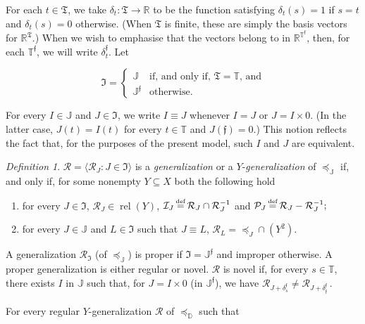 \documentclass[ecta,nameyear,draft]{econsocart}
\newcommand{\bs}{-}%
\newcommand{\R}{\mathbb R}
\newcommand{\mc}{\mathcal}
\newcommand\defeq{\mathrel{\overset{\makebox[0pt]{\mbox{\normalfont\tiny def}}}{=}}}%
\newcommand{\relations}{\operatorname{rel}}
\newcommand{\novel}{\mathfrak f}
\newcommand{\preceqb}{\mathbin{\preceq}}
\newcommand{\ext}{\mathrel{\mc R}}
\newcommand{\extb}{\mathbin{\mc R}}
\newcommand{\sextb}{\mathbin{\mc P}}
\newcommand{\nextb}{\mathbin{\mc I}}
\newcommand{\mbbd}{{\mathds D}}
\newcommand{\mbbt}{{\mathds {T}}}
\newcommand{\mbbtp}{{\mathds{T}^\novel}}
\newcommand{\mbbtpp}{{\mathfrak{T}}}
\newcommand{\mbbj}{\mathds J}
\newcommand{\mbbjp}{{\mathds {J}^{\novel}}}
\newcommand{\mbbjpp}{\mathfrak{I}}
\theoremstyle{plain}
\theoremstyle{remark}
\newtheorem{definition}{Definition}%
\begin{document}
\begin{appendix}
  For each $t \in \mbbtpp$, we take $\delta_{t} : \mbbtpp \rightarrow \R$ to be
  the function satisfying $\delta_{t} ( s ) = 1$ if $s = t$ and $\delta_{t} (s)
  = 0$ otherwise. (When $\mbbtpp$ is finite, these are simply the basis vectors
  for $\R^{\mbbtpp}$.)  When we wish to emphasise that the vectors belong to in
  $\R^{\mbbtp}$, then, for each $\mbbtp$, we will write $\delta_{t}^{\novel}$.
  Let
  \begin{linenomath*}
    \begin{equation*}
      \text{$\mbbjpp$} = \left \{
        \begin{array}{ll}
          \mbbj & \text{if, and only if, $\mbbtpp = \mbbt$, and} \\
          \mbbjp & \text{otherwise.}
      \end{array}\right.
    \end{equation*}
  \end{linenomath*}
  For every $I \in \mbbj$ and $J \in \mbbjpp$, we write $I \equiv J$ whenever
  $I
  = J$ or $J = I\times 0$. (In the latter case, $J(t)= I(t)$ for every $t\in
  \mbbt$ and $J(\novel )= 0$.) This notion reflects the fact that, for the
  purposes of the present model, such $I$ and $J$ are equivalent.
  \begin{definition}\label{def-generalizationQ} $\extb =\langle \extb_{J}: J
    \in \mbbjpp \rangle$ is a \emph{{generalization}} or a
    $Y$-\emph{{generalization}} of $\preceqb _{\mbbj}$ if, and only if, for
    some nonempty $Y \subseteq X$ both the following hold
    \begin{enumerate}
      \item for every $J\in \mbbjpp$, $\extb_{J}\in \relations(Y)$, $\nextb_{J}
        \defeq \extb_{J} \cap \extb_{J}^{-1}$ and $\sextb_{J} \defeq \extb_{J}
        \bs \extb_{J}^{-1};$
      \item for every $J \in \mbbj$ and $L \in \mbbjpp$ such that $J \equiv L$,
        $\extb_{L} = \preceqb_{J} \cap (Y^2)$. \label{item-preservingQ}
    \end{enumerate}
    A {generalization} $\ext_{\mbbjpp}$ (of $\preceq_{\mbbj}$) is proper if
    $\mbbjpp= \mbbjp$ and improper otherwise.  A proper {generalization} is
    either regular or novel. $\ext$ is novel if, for every $s \in \mbbt$, there
    exists $I$ in $\mbbj$ such that, for $J = I \times 0$ (in $\mbbjp$), we
    have $\extb _ {J + \delta _{s}^{\novel}} \neq \extb _ {J + \delta _
    {\novel}^{\novel} }$\,.
  \end{definition} 
  For every regular $Y$-{generalization} $\ext$ of $\preceq_{\mbbd}$ such that

\end{appendix}
\end{document}
